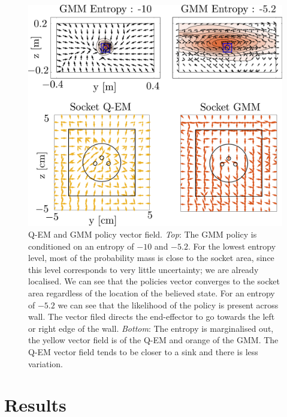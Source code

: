 \begin{figure}
   \includegraphics[width=\textwidth]{./ch4-PiH/Figures/Qualitative/policy_vf.pdf}
  \caption{Q-EM and GMM policy vector field. \textit{Top}: The GMM policy is conditioned on an entropy of $-10$ and $-5.2$. For the lowest entropy level,
  most of the probability mass is close to the socket area, since this level corresponds to very little uncertainty; we are already localised. We can see 
  that the policies vector converges to the socket area regardless of the location of the believed state. For an entropy of $-5.2$ we can see that 
  the likelihood of the policy is present across wall. The vector filed directs the end-effector to go towards the left or right edge of the wall. 
  \textit{Bottom}: The entropy is marginalised out, the yellow vector field is of the Q-EM and orange of the GMM. The Q-EM vector field tends 
  to be closer to a sink and there is less variation.}
  \label{fig:policy_vf}
\end{figure}

\FloatBarrier
\section{Results}\label{ch4:results}

